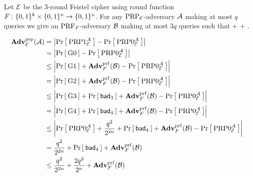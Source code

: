 \begin{figure}
\end{figure}

\newpage

\begin{theorem}
Let $\Feistel$ be the 3-round Feistel cipher using round function 
$F\Colon\bits^k\times\bits^n\rightarrow \bits^n$. For any
$\PRP_\cipher$-adversary $\advA$ making at most $q$ queries 
we give an $\PRF_F$-adversary $\advB$ making at most $3q$ queries such that
\bnm
  \AdvPRP{\Feistel}{\advA} \le {} +  +
   \;.
\enm
\end{theorem}



\begin{align*}
\AdvPRP{\cipher}{\advA} 
    &= \left|\Prob{\PRP1^\advA_\cipher} - \Prob{\PRP0^\advA_\cipher}\right|\\
    &= \left|\Prob{\G0} - \Prob{\PRP0^\advA_\cipher}\right|\\
    &\le \left|\Prob{\G1} + \AdvPRF{F}{\advB} - \Prob{\PRP0^\advA_\cipher}\right|\\
    &=   \left|\Prob{\G2} + \AdvPRF{F}{\advB} - \Prob{\PRP0^\advA_\cipher}\right|\\
    &\le \left|\Prob{\G3} + \Prob{\bad_3} + \AdvPRF{F}{\advB} - \Prob{\PRP0^\advA_\cipher}\right|\\
    &= \left|\Prob{\G4} + \Prob{\bad_4} + \AdvPRF{F}{\advB} - \Prob{\PRP0^\advA_\cipher}\right|\\
    &\le \left|\Prob{\PRP0^\advA_\cipher} + \frac{q^2}{2^{2n}} + \Prob{\bad_4} + \AdvPRF{F}{\advB} - \Prob{\PRP0^\advA_\cipher}\right|\\
    &= \frac{q^2}{2^{2n}} + \Prob{\bad_4} + \AdvPRF{F}{\advB}\\
    &\le \frac{q^2}{2^{2n}} + \frac{2q^2}{2^n} + \AdvPRF{F}{\advB}\\
\end{align*}

